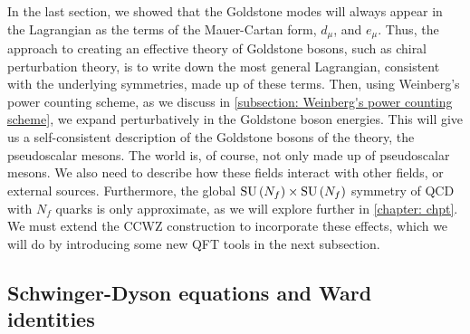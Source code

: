 In the last section, we showed that the Goldstone modes will always appear in the Lagrangian as the terms of the Mauer-Cartan form, $d_\mu$, and $e_\mu$.
Thus, the approach to creating an effective theory of Goldstone bosons, such as chiral perturbation theory, is to write down the most general Lagrangian, consistent with the underlying symmetries, made up of these terms.
Then, using Weinberg's power counting scheme, as we discuss in \autoref{subsection: Weinberg's power counting scheme}, we expand perturbatively in the Goldstone boson energies.
This will give us a self-consistent description of the Goldstone bosons of the theory, the pseudoscalar mesons.
The world is, of course, not only made up of pseudoscalar mesons.
We also need to describe how these fields interact with other fields, or external sources.
Furthermore, the global $\text{SU}\left(N_f\right)\times\text{SU}\left(N_f\right)$ symmetry of QCD with $N_f$ quarks is only approximate, as we will explore further in \autoref{chapter: chpt}.
We must extend the CCWZ construction to incorporate these effects, which we will do by introducing some new QFT tools in the next subsection.



\subsection{Schwinger-Dyson equations and Ward identities}



